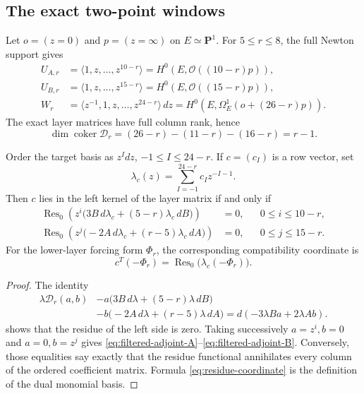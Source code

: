 \subsection{The exact two-point windows}

Let $o=(z=0)$ and $p=(z=\infty)$ on $E\simeq\mathbf P^1$.  For
$5\le r\le8$, the full Newton support gives
\begin{align}
 U_{A,r}&=\langle1,z,\ldots,z^{10-r}\rangle
        =H^0(E,\mathcal O((10-r)p)),\label{eq:UA-window}\\
 U_{B,r}&=\langle1,z,\ldots,z^{15-r}\rangle
        =H^0(E,\mathcal O((15-r)p)),\label{eq:UB-window}\\
 W_r&=\langle z^{-1},1,z,\ldots,z^{24-r}\rangle\,dz
     =H^0(E,\Omega_E^1(o+(26-r)p)).\label{eq:W-window}
\end{align}
The exact layer matrices have full column rank, hence
\[
 \dim\operatorname{coker}\mathscr D_r
 =(26-r)-(11-r)-(16-r)=r-1.
\]

\begin{proposition}
\label{prop:filtered-principal-part-duality}
Order the target basis as $z^I dz$, $-1\le I\le24-r$.  If
$c=(c_I)$ is a row vector, set
\[
 \lambda_c(z)=\sum_{I=-1}^{24-r}c_Iz^{-I-1}.
\]
Then $c$ lies in the left kernel of the layer matrix if and only if
\begin{align}
 \operatorname{Res}_{0}\!
 \left(z^i\bigl(3B\,d\lambda_c+(5-r)\lambda_c\,dB\bigr)\right)&=0,
 &&0\le i\le10-r,\label{eq:filtered-adjoint-A}\\
 \operatorname{Res}_{0}\!
 \left(z^j\bigl(-2A\,d\lambda_c+(r-5)\lambda_c\,dA\bigr)\right)&=0,
 &&0\le j\le15-r.\label{eq:filtered-adjoint-B}
\end{align}
For the lower-layer forcing form $\Phi_r$, the corresponding compatibility
coordinate is
\begin{equation}
\label{eq:residue-coordinate}
 c^T(-\Phi_r)
 =\operatorname{Res}_{0}\bigl(\lambda_c(-\Phi_r)\bigr).
\end{equation}
\end{proposition}

\begin{proof}
The identity
\begin{align*}
 \lambda\mathscr D_r(a,b)
 &-a\bigl(3B\,d\lambda+(5-r)\lambda\,dB\bigr)\\
 &-b\bigl(-2A\,d\lambda+(r-5)\lambda\,dA\bigr)
 =d(-3\lambda Ba+2\lambda Ab).
\end{align*}
shows that the residue of the left side is zero.  Taking successively
$a=z^i,b=0$ and $a=0,b=z^j$ gives
\eqref{eq:filtered-adjoint-A}--\eqref{eq:filtered-adjoint-B}.  Conversely,
those equalities say exactly that the residue functional annihilates every
column of the ordered coefficient matrix.  Formula
\eqref{eq:residue-coordinate} is the definition of the dual monomial basis.
\end{proof}

